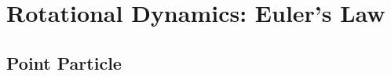 \begin{comment}
Probably should rename rigid body to system of particles. 
There has to be a distinction between the two. 
Rigid bodies have the constraint that particles cannot move with respect to one another meanwhile for a system of particles, particles can still move relative to one another. 
Think of an aircraft as a rigid body meanwhile the earth and moon as a system of particles.
\end{comment}

\chapter{Rotational Dynamics: Euler's Law}
\begin{comment}
\end{comment}
\section{Point Particle}
\begin{comment}
\end{comment}
